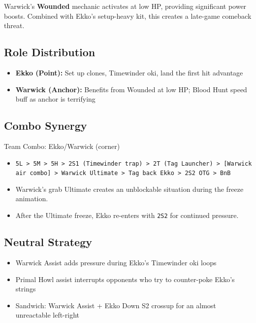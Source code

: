 \documentclass[12pt, a4paper]{report}
\newcommand{\notation}[1]{{\small\texttt{\textcolor{ekkoBlue}{#1}}}}
\begin{document}
Warwick's \textbf{Wounded} mechanic activates at low HP, providing significant power boosts. Combined with Ekko's setup-heavy kit, this creates a late-game comeback threat.

\subsection{Role Distribution}

\begin{itemize}
  \item \textbf{Ekko (Point):} Set up clones, Timewinder oki, land the first hit advantage
  \item \textbf{Warwick (Anchor):} Benefits from Wounded at low HP; Blood Hunt speed buff as anchor is terrifying
\end{itemize}

\subsection{Combo Synergy}

\begin{combobox}[]{Team Combo: Ekko/Warwick (corner)}
\begin{itemize}
  \item \notation{5L > 5M > 5H > 2S1 (Timewinder trap) > 2T (Tag Launcher) > [Warwick air combo] > Warwick Ultimate > Tag back Ekko > 2S2 OTG > BnB}
  \item Warwick's grab Ultimate creates an unblockable situation during the freeze animation.
  \item After the Ultimate freeze, Ekko re-enters with \notation{2S2} for continued pressure.
\end{itemize}
\end{combobox}

\subsection{Neutral Strategy}

\begin{itemize}
  \item Warwick Assist adds pressure during Ekko's Timewinder oki loops
  \item Primal Howl assist interrupts opponents who try to counter-poke Ekko's strings
  \item Sandwich: Warwick Assist + Ekko Down S2 crossup for an almost unreactable left-right
\end{itemize}
\end{document}
